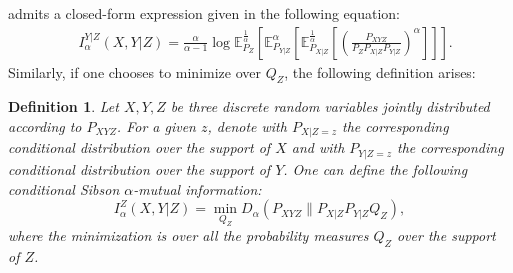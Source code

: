 \documentclass{article}
\numberwithin{theorem}{section}
\numberwithin{example}{section}
\numberwithin{remark}{section}
\newtheorem{definition}{Definition}
\numberwithin{definition}{section}
\newcommand{\E}{\mathbb{E}}
\begin{document}
 admits a closed-form expression given in the following equation:
\begin{equation}
\begin{split}
    &I^{Y|Z}_\alpha(X,Y|Z) = \frac{\alpha}{\alpha-1}\log \E^\frac1\alpha_{P_Z}\left[\E^\alpha_{P_{Y|Z}}\left[\E^{\frac1\alpha}_{P_{X|Z}}\left[\left(\frac{P_{XYZ}}{P_ZP_{X|Z}P_{Y|Z}}\right)^\alpha\right]\right]\right]. \label{eq:closedFormCondY|Z}
\end{split}
\end{equation}
Similarly, if one chooses to minimize over $Q_Z$, the following definition arises:
\begin{definition}
Let $X,Y,Z$ be three discrete random variables jointly distributed according to $P_{XYZ}$. For a given $z$, denote with $P_{X|Z=z}$ the corresponding conditional distribution over the support of $X$ and with $P_{Y|Z=z}$ the corresponding conditional distribution over the support of $Y$. One can define the following conditional Sibson $\alpha$-mutual information: 
\begin{equation}
    I^{Z}_\alpha(X,Y|Z) = \min_{Q_{Z}} D_\alpha(P_{XYZ}\|P_{X|Z}P_{Y|Z}Q_Z),\label{eq:conditionalZ}
\end{equation}
where the minimization is over all the probability measures $Q_Z$ over the support of $Z$.
\end{definition}
\end{document}
